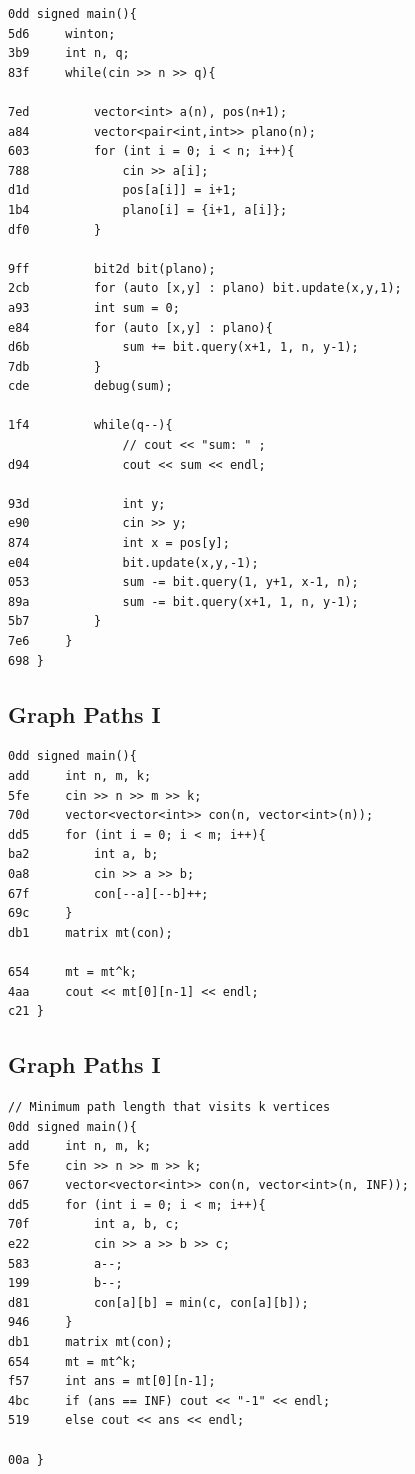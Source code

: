 \documentclass[11pt, a4paper, twoside]{article}
\begin{document}
\begin{lstlisting}
0dd signed main(){
5d6     winton;
3b9     int n, q;
83f     while(cin >> n >> q){
    
7ed         vector<int> a(n), pos(n+1);
a84         vector<pair<int,int>> plano(n);
603         for (int i = 0; i < n; i++){
788             cin >> a[i];
d1d             pos[a[i]] = i+1;
1b4             plano[i] = {i+1, a[i]};
df0         }
            
9ff         bit2d bit(plano);
2cb         for (auto [x,y] : plano) bit.update(x,y,1);
a93         int sum = 0;
e84         for (auto [x,y] : plano){
d6b             sum += bit.query(x+1, 1, n, y-1);
7db         } 
cde         debug(sum);
            
1f4         while(q--){
                // cout << "sum: " ;
d94             cout << sum << endl;
                
93d             int y;
e90             cin >> y;
874             int x = pos[y];
e04             bit.update(x,y,-1);
053             sum -= bit.query(1, y+1, x-1, n);
89a             sum -= bit.query(x+1, 1, n, y-1);
5b7         }       
7e6     }
698 }
\end{lstlisting}

\subsection{Graph Paths I}
\begin{lstlisting}
0dd signed main(){
add     int n, m, k;
5fe     cin >> n >> m >> k;
70d     vector<vector<int>> con(n, vector<int>(n));
dd5     for (int i = 0; i < m; i++){
ba2         int a, b;
0a8         cin >> a >> b;
67f         con[--a][--b]++;
69c     }
db1     matrix mt(con);
        
654     mt = mt^k;
4aa     cout << mt[0][n-1] << endl;
c21 }
\end{lstlisting}

\subsection{Graph Paths I}
\begin{lstlisting}
// Minimum path length that visits k vertices
0dd signed main(){
add     int n, m, k;
5fe     cin >> n >> m >> k;
067     vector<vector<int>> con(n, vector<int>(n, INF));
dd5     for (int i = 0; i < m; i++){
70f         int a, b, c;
e22         cin >> a >> b >> c;
583         a--;
199         b--;
d81         con[a][b] = min(c, con[a][b]);
946     }
db1     matrix mt(con);
654     mt = mt^k; 
f57     int ans = mt[0][n-1];
4bc     if (ans == INF) cout << "-1" << endl;
519     else cout << ans << endl;
    
00a }
\end{lstlisting}
\end{document}
